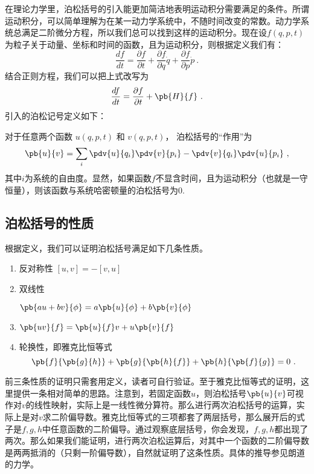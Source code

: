 
\begin{issues}
\issueDraft
\end{issues}

在理论力学里，泊松括号的引入能更加简洁地表明运动积分需要满足的条件。所谓运动积分，可以简单理解为在某一动力学系统中，不随时间改变的常数。动力学系统总满足二阶微分方程，所以我们总可以找到这样的运动积分。现在设$f(q,p,t)$为粒子关于动量、坐标和时间的函数，且为运动积分，则根据定义我们有：
\begin{equation}
\frac{df}{dt}=\frac{\partial f}{\partial t}+\frac{\partial f}{\partial q}\dot{q}+\frac{\partial f}{\partial p}\dot{ p}~.
\end{equation}
结合正则方程，我们可以把上式改写为
\begin{equation}\label{eq_poison_10}
\frac{df}{dt}=\frac{\partial f}{\partial t}+\pb{H}{f}~.
\end{equation}
引入的泊松记号定义如下：


对于任意两个函数 $u(q, p, t)$ 和 $v(q, p, t)$， 泊松括号的“作用”为
\begin{equation}\label{eq_poison_1}
\pb{u}{v} = \sum_i \pdv{u}{q_i}\pdv{v}{p_i} - \pdv{v}{q_i}\pdv{u}{p_i}~,
\end{equation}
其中$i$为系统的自由度。显然，如果函数$f$不显含时间，且为运动积分（也就是一守恒量），则该函数与系统哈密顿量的泊松括号为0.

\subsection{泊松括号的性质}
根据定义，我们可以证明泊松括号满足如下几条性质。
\begin{enumerate}
\item 反对称性
$[u,v]=-[v,u]$
\item 双线性

$\pb{au+bv}{\phi}=a\pb{u}{\phi}+b\pb{v}{\phi}$
\item 
$\pb{uv}{f}=\pb{u}{f}v+u\pb{v}{f}$

\item 轮换性，即雅克比恒等式
\begin{equation}
\pb{f}{\pb{g}{h}}+\pb{g}{\pb{h}{f}}+\pb{h}{\pb{f}{g}}=0~.
\end{equation}
\end{enumerate}
前三条性质的证明只需套用定义，读者可自行验证。至于雅克比恒等式的证明，这里提供一条相对简单的思路。注意到，若固定函数$u$，则泊松括号$\pb{u}{v}$可视作对$v$的线性映射，实际上是一线性微分算符。那么进行两次泊松括号的运算，实际上是对$v$求二阶偏导数。雅克比恒等式的三项都套了两层括号，那么展开后的式子是$f,g,h$中任意函数的二阶偏导。通过观察底层括号，你会发现，$f,g,h$都出现了两次。那么如果我们能证明，进行两次泊松运算后，对其中一个函数的二阶偏导数是两两抵消的（只剩一阶偏导数），自然就证明了这条性质。具体的推导参见朗道的力学。

